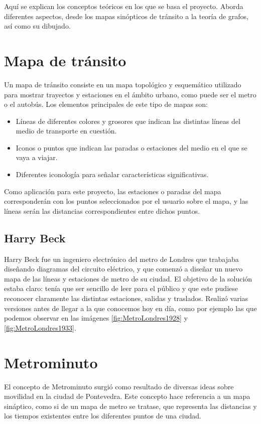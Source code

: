 
Aquí se explican los conceptos teóricos en los que se basa el proyecto. Aborda diferentes aspectos, desde los mapas sinópticos de tránsito a la teoría de grafos, así como su dibujado.

\section{Mapa de tránsito}
Un mapa de tránsito consiste en un mapa topológico y esquemático utilizado para mostrar trayectos y estaciones en el ámbito urbano, como puede ser el metro o el autobús. Los elementos principales de este tipo de mapas son:
\begin{itemize}
	\item Líneas de diferentes colores y grosores que indican las distintas líneas del medio de transporte en cuestión.
	\item Iconos o puntos que indican las paradas o estaciones del medio en el que se vaya a viajar.
	\item Diferentes iconología para señalar características significativas.
\end{itemize}
Como aplicación para este proyecto, las estaciones o paradas del mapa corresponderán con los puntos seleccionados por el usuario sobre el mapa, y las líneas serán las distancias correspondientes entre dichos puntos.

\subsection{Harry Beck}
Harry Beck fue un ingeniero electrónico del metro de Londres que trabajaba diseñando diagramas del circuito eléctrico, y que comenzó a diseñar un nuevo mapa de las líneas y estaciones de metro de su ciudad. El objetivo de la solución estaba claro: tenía que ser sencillo de leer para el público y que este pudiese reconocer claramente las distintas estaciones, salidas y traslados.
Realizó varias versiones antes de llegar a la que conocemos hoy en día, como por ejemplo las que podemos observar en las imágenes \ref{fig:MetroLondres1928} y \ref{fig:MetroLondres1933}.

\section{Metrominuto}
El concepto de Metrominuto surgió como resultado de diversas ideas sobre movilidad en la ciudad de Pontevedra. Este concepto hace referencia a un mapa sináptico, como si de un mapa de metro se tratase, que representa las distancias y los tiempos existentes entre los diferentes puntos de una ciudad.

